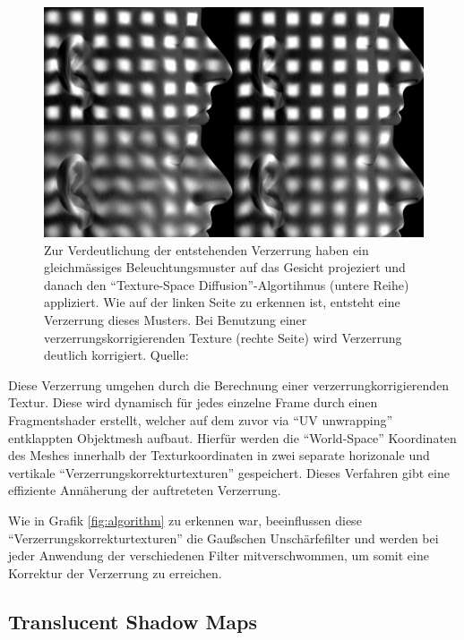 \documentclass[ngerman,runningheads,a4paper]{llncs}[2018/03/10]
\begin{document}
\begin{figure}
  \centering
  \includegraphics[scale=0.4,keepaspectratio]{./images/texture_space_stretch.jpg}
  \caption{Zur Verdeutlichung der entstehenden Verzerrung haben \citeauthor{efficient-human-skin-rendering} ein gleichmässiges Beleuchtungsmuster auf das Gesicht projeziert und danach den
  \enquote{Texture-Space Diffusion}-Algortihmus (untere Reihe) appliziert. Wie auf der linken Seite zu erkennen ist, entsteht eine Verzerrung dieses Musters. Bei Benutzung einer verzerrungskorrigierenden Texture (rechte Seite) wird Verzerrung deutlich korrigiert. Quelle: \cite{efficient-human-skin-rendering}}
  \label{fig:stretching}
\end{figure}

Diese Verzerrung umgehen \citet{efficient-human-skin-rendering} durch die Berechnung einer verzerrungkorrigierenden Textur.
Diese wird dynamisch für jedes einzelne Frame durch einen Fragmentshader erstellt, welcher auf dem zuvor via \enquote{UV unwrapping} entklappten Objektmesh aufbaut.
Hierfür werden die \enquote{World-Space} Koordinaten des Meshes innerhalb der Texturkoordinaten in zwei separate horizonale und vertikale \enquote{Verzerrungskorrekturtexturen} gespeichert.
Dieses Verfahren gibt eine effiziente Annäherung der auftreteten Verzerrung.

Wie in Grafik \ref{fig:algorithm} zu erkennen war, beeinflussen diese \enquote{Verzerrungskorrekturtexturen} die Gaußschen Unschärfefilter und werden bei jeder Anwendung der verschiedenen Filter mitverschwommen, um somit eine Korrektur der Verzerrung zu erreichen.

\subsection{Translucent Shadow Maps}
\label{sub:translucent-shadow-maps}
\end{document}

